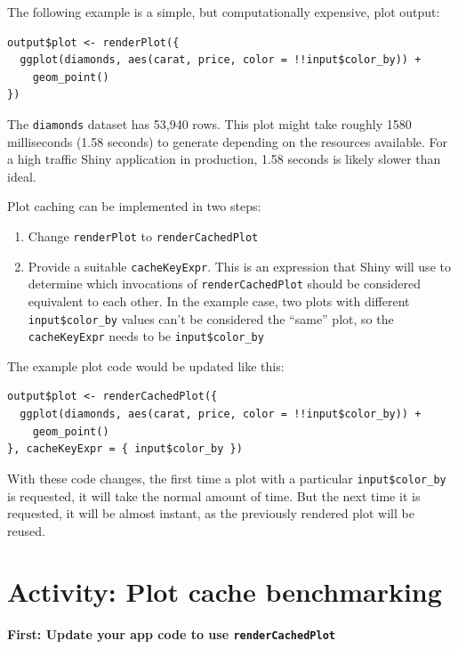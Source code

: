 \documentclass[]{book}
\providecommand{\tightlist}{%
  \setlength{\itemsep}{0pt}\setlength{\parskip}{0pt}}
\theoremstyle{definition}
\theoremstyle{definition}
\theoremstyle{definition}
\theoremstyle{remark}
\begin{document}
The following example is a simple, but computationally expensive, plot
output:

\begin{verbatim}
output$plot <- renderPlot({
  ggplot(diamonds, aes(carat, price, color = !!input$color_by)) +
    geom_point()
})
\end{verbatim}

The \texttt{diamonds} dataset has 53,940 rows. This plot might take
roughly 1580 milliseconds (1.58 seconds) to generate depending on the
resources available. For a high traffic Shiny application in production,
1.58 seconds is likely slower than ideal.

Plot caching can be implemented in two steps:

\begin{enumerate}
\def\labelenumi{\arabic{enumi}.}
\tightlist
\item
  Change \texttt{renderPlot} to \texttt{renderCachedPlot}
\item
  Provide a suitable \texttt{cacheKeyExpr}. This is an expression that
  Shiny will use to determine which invocations of
  \texttt{renderCachedPlot} should be considered equivalent to each
  other. In the example case, two plots with different
  \texttt{input\$color\_by} values can't be considered the ``same''
  plot, so the \texttt{cacheKeyExpr} needs to be
  \texttt{input\$color\_by}
\end{enumerate}

The example plot code would be updated like this:

\begin{verbatim}
output$plot <- renderCachedPlot({
  ggplot(diamonds, aes(carat, price, color = !!input$color_by)) +
    geom_point()
}, cacheKeyExpr = { input$color_by })
\end{verbatim}

With these code changes, the first time a plot with a particular
\texttt{input\$color\_by} is requested, it will take the normal amount
of time. But the next time it is requested, it will be almost instant,
as the previously rendered plot will be reused.

\hypertarget{activity-plot-cache-benchmarking}{%
\section{Activity: Plot cache
benchmarking}\label{activity-plot-cache-benchmarking}}

\textbf{First: Update your app code to use \texttt{renderCachedPlot}}
\end{document}
